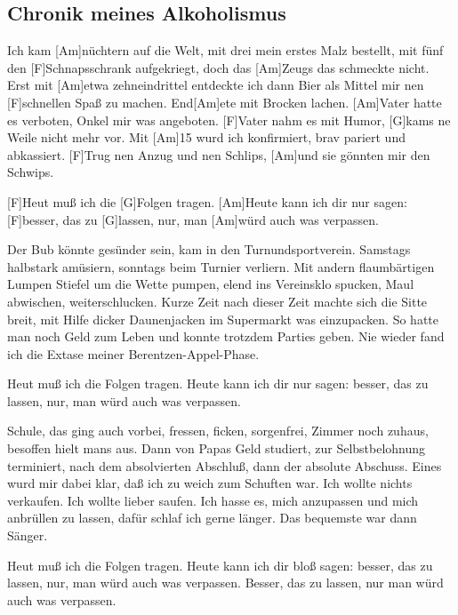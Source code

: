 \subsection*{Chronik meines Alkoholismus   }
\begin{guitar}

Ich kam [Am]nüchtern auf die Welt, mit drei mein erstes Malz bestellt,
mit fünf den [F]Schnapsschrank aufgekriegt, doch das [Am]Zeugs das schmeckte nicht.
Erst mit [Am]etwa zehneindrittel entdeckte ich dann Bier als Mittel
mir nen [F]schnellen Spaß zu machen. End[Am]ete mit Brocken lachen.
[Am]Vater hatte es verboten, Onkel mir was angeboten.
[F]Vater nahm es mit Humor, [G]kams ne Weile nicht mehr vor.
Mit [Am]15 wurd ich konfirmiert, brav pariert und abkassiert.
[F]Trug nen Anzug und nen Schlips, [Am]und sie gönnten mir den Schwips.


[F]Heut muß ich die [G]Folgen tragen. [Am]Heute kann ich dir nur sagen:
[F]besser, das zu [G]lassen, nur, man [Am]würd auch was verpassen.


Der Bub könnte gesünder sein, kam in den Turnundsportverein.
Samstags halbstark amüsiern, sonntags beim Turnier verliern.
Mit andern flaumbärtigen Lumpen Stiefel um die Wette pumpen,
elend ins Vereinsklo spucken, Maul abwischen, weiterschlucken.
Kurze Zeit nach dieser Zeit machte sich die Sitte breit,
mit Hilfe dicker Daunenjacken im Supermarkt was einzupacken.
So hatte man noch Geld zum Leben und konnte trotzdem Parties geben.
Nie wieder fand ich die Extase meiner Berentzen-Appel-Phase.


Heut muß ich die Folgen tragen. Heute kann ich dir nur sagen:
besser, das zu lassen, nur, man würd auch was verpassen.


Schule, das ging auch vorbei, fressen, ficken, sorgenfrei,
Zimmer noch zuhaus, besoffen hielt mans aus.
Dann von Papas Geld studiert, zur Selbstbelohnung terminiert,
nach dem absolvierten Abschluß, dann der absolute Abschuss.
Eines wurd mir dabei klar, daß ich zu weich zum Schuften war.
Ich wollte nichts verkaufen. Ich wollte lieber saufen.
Ich hasse es, mich anzupassen und mich anbrüllen zu lassen,
dafür schlaf ich gerne länger. Das bequemste war dann Sänger.


Heut muß ich die Folgen tragen. Heute kann ich dir bloß sagen:
besser, das zu lassen, nur, man würd auch was verpassen.
Besser, das zu lassen, nur man würd auch was verpassen.  
\end{guitar}
